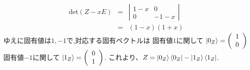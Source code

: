 \begin{itemize}
\begin{eqnarray*}
\mathrm{det}(Z - xE) &=& \left| \begin{array}{cc}
	1-x & 0\\
	0 & -1-x
	\end{array}
	\right| \\
	&=& (1-x)(1+x)
\end{eqnarray*}
ゆえに固有値は$1, -1$で,対応する固有ベクトルは
\newline
固有値$1$に関して
$\ket{0_Z} = \left( \begin{array}{c}
	1\\
	0
	\end{array}
\right)
$
固有値$-1$に関して
$\ket{1_Z} = \left( \begin{array}{c}
	0\\
	1
	\end{array}
\right)
$.
\newline
これより、$Z = \ket{0_Z}\bra{0_Z} - \ket{1_Z}\bra{1_Z}$.
\end{itemize}
